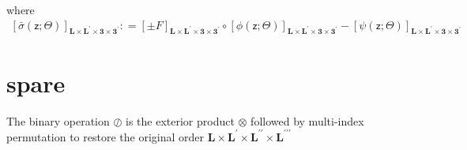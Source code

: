 \documentclass[preprint,12pt]{elsarticle}
\newcommand*{\M}[1]{\ensuremath{#1}\xspace}
\newcommand*{\x}{\times}
\newcommand*{\mi}[1]{\mathbf{#1}}
\newcommand*{\rv}[1]{\mathsf{#1}}
\newcommand*{\te}[2][]{\left\lbrack{#2}\right\rbrack_{#1}}
\newcommand*{\deq}{\M{\mathrel{\mathop:}=}}
\begin{document}
        where
        \begin{multline*}
            \te[\mi{L\x L^{\prime}\x 3\x 3^{\prime}}]{\bar{\sigma}(\rv{z}; \Theta)} \deq
            \te[\mi{L\x L^{\prime}\x 3\x 3^{\prime}}]{\pm F}
            \circ \te[\mi{L\x L^{\prime}\x 3\x 3^{\prime}}]{\phi(\rv{z}; \Theta)} - 
            \te[\mi{L\x L^{\prime}\x 3\x 3^{\prime}}]{\psi(\rv{z}; \Theta)}
        \end{multline*}

\section{spare}
    The binary operation $\oslash$ is the exterior product $\otimes$ followed by multi-index permutation to restore the original order $\mi{L\x L^{\prime}\x L^{\prime\prime}\x L^{\prime\prime\prime}}$
\end{document}
